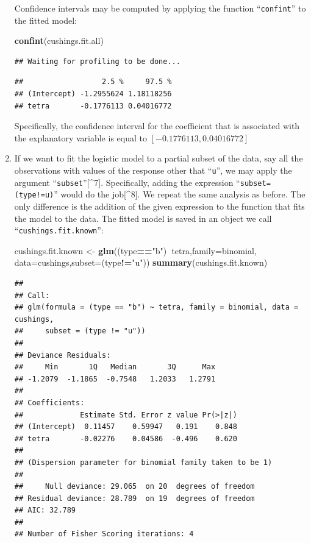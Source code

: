 \documentclass[
]{krantz}
\makeatletter
\newenvironment{Shaded}{\begin{snugshade}}{\end{snugshade}}
\newcommand{\DataTypeTok}[1]{\textcolor[rgb]{0.13,0.29,0.53}{#1}}
\newcommand{\KeywordTok}[1]{\textcolor[rgb]{0.13,0.29,0.53}{\textbf{#1}}}
\newcommand{\NormalTok}[1]{#1}
\newcommand{\OperatorTok}[1]{\textcolor[rgb]{0.81,0.36,0.00}{\textbf{#1}}}
\newcommand{\StringTok}[1]{\textcolor[rgb]{0.31,0.60,0.02}{#1}}
\newenvironment{kframe}{%
\medskip{}
\setlength{\fboxsep}{.8em}
 \def\at@end@of@kframe{}%
 \ifinner\ifhmode%
  \def\at@end@of@kframe{\end{minipage}}%
  \begin{minipage}{\columnwidth}%
 \fi\fi%
 \def\FrameCommand##1{\hskip\@totalleftmargin \hskip-\fboxsep
 \colorbox{shadecolor}{##1}\hskip-\fboxsep
     \hskip-\linewidth \hskip-\@totalleftmargin \hskip\columnwidth}%
 \MakeFramed {\advance\hsize-\width
   \@totalleftmargin\z@ \linewidth\hsize
   \@setminipage}}%
 {\par\unskip\endMakeFramed%
 \at@end@of@kframe}
\renewenvironment{Shaded}{\begin{kframe}}{\end{kframe}}
\theoremstyle{definition}
\theoremstyle{definition}
\theoremstyle{definition}
\theoremstyle{remark}
\makeatother
\begin{document}
\begin{enumerate}
  Confidence intervals may be computed by applying the function
  ``\texttt{confint}'' to the fitted model:

\begin{Shaded}
\begin{Highlighting}[]
\KeywordTok{confint}\NormalTok{(cushings.fit.all)}
\end{Highlighting}
\end{Shaded}

\begin{verbatim}
## Waiting for profiling to be done...
\end{verbatim}

\begin{verbatim}
##                  2.5 %     97.5 %
## (Intercept) -1.2955624 1.18118256
## tetra       -0.1776113 0.04016772
\end{verbatim}

  Specifically, the confidence interval for the coefficient that is
  associated with the explanatory variable is equal to
  \([-0.1776113, 0.04016772]\)
\item
  If we want to fit the logistic model
  to a partial subset of the data, say all the observations with values of
  the response other that ``\texttt{u}'', we may apply the argument ``\texttt{subset}''{[}\^{}7{]}.
  Specifically, adding the expression ``\texttt{subset=(type!=u)}'' would do the
  job{[}\^{}8{]}. We repeat the same analysis as before. The only difference is
  the addition of the given expression to the function that fits the model
  to the data. The fitted model is saved in an object we call
  ``\texttt{cushings.fit.known}'':

\begin{Shaded}
\begin{Highlighting}[]
\NormalTok{cushings.fit.known <-}\StringTok{ }\KeywordTok{glm}\NormalTok{((type}\OperatorTok{==}\StringTok{"b"}\NormalTok{)}\OperatorTok{~}\NormalTok{tetra,}\DataTypeTok{family=}\NormalTok{binomial, }\DataTypeTok{data=}\NormalTok{cushings,}\DataTypeTok{subset=}\NormalTok{(type}\OperatorTok{!=}\StringTok{"u"}\NormalTok{))}
\KeywordTok{summary}\NormalTok{(cushings.fit.known)}
\end{Highlighting}
\end{Shaded}

\begin{verbatim}
## 
## Call:
## glm(formula = (type == "b") ~ tetra, family = binomial, data = cushings, 
##     subset = (type != "u"))
## 
## Deviance Residuals: 
##     Min       1Q   Median       3Q      Max  
## -1.2079  -1.1865  -0.7548   1.2033   1.2791  
## 
## Coefficients:
##             Estimate Std. Error z value Pr(>|z|)
## (Intercept)  0.11457    0.59947   0.191    0.848
## tetra       -0.02276    0.04586  -0.496    0.620
## 
## (Dispersion parameter for binomial family taken to be 1)
## 
##     Null deviance: 29.065  on 20  degrees of freedom
## Residual deviance: 28.789  on 19  degrees of freedom
## AIC: 32.789
## 
## Number of Fisher Scoring iterations: 4
\end{verbatim}


\end{enumerate}
\end{document}
